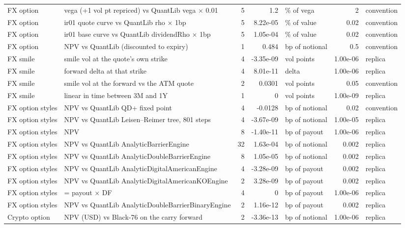 \documentclass[11pt,a4paper]{article}
\begin{document}
{\begin{longtable}{>{\raggedright\arraybackslash}p{2.2cm}>{\raggedright\arraybackslash}p{4.6cm} r r >{\raggedright\arraybackslash}p{1.8cm} r >{\raggedright\arraybackslash}p{1.8cm}}
FX option & vega (+1 vol pt repriced) vs QuantLib vega × 0.01 & 5 & 1.2 & \% of vega & 2 & convention \\
FX option & ir01 quote curve vs QuantLib rho × 1bp & 5 & 8.22e-05 & \% of value & 0.02 & convention \\
FX option & ir01 base curve vs QuantLib dividendRho × 1bp & 5 & 1.05e-04 & \% of value & 0.02 & convention \\
FX option & NPV vs QuantLib (discounted to expiry) & 1 & 0.484 & bp of notional & 0.5 & convention \\
FX smile & smile vol at the quote's own strike & 4 & -3.35e-09 & vol points & 1.00e-06 & replica \\
FX smile & forward delta at that strike & 4 & 8.01e-11 & delta & 1.00e-06 & replica \\
FX smile & smile vol at the forward vs the ATM quote & 2 & 0.0301 & vol points & 0.05 & convention \\
FX smile & linear in time between 3M and 1Y & 1 & 0 & vol points & 1.00e-09 & replica \\
FX option styles & NPV vs QuantLib QD+ fixed point & 4 & -0.0128 & bp of notional & 0.02 & convention \\
FX option styles & NPV vs QuantLib Leisen–Reimer tree, 801 steps & 4 & -3.67e-09 & bp of notional & 1.00e-05 & replica \\
FX option styles & NPV & 8 & -1.40e-11 & bp of payout & 1.00e-06 & replica \\
FX option styles & NPV vs QuantLib AnalyticBarrierEngine & 32 & 1.63e-04 & bp of notional & 0.002 & replica \\
FX option styles & NPV vs QuantLib AnalyticDoubleBarrierEngine & 8 & 1.05e-05 & bp of notional & 0.002 & replica \\
FX option styles & NPV vs QuantLib AnalyticDigitalAmericanEngine & 4 & -3.28e-09 & bp of payout & 0.002 & replica \\
FX option styles & NPV vs QuantLib AnalyticDigitalAmericanKOEngine & 2 & 3.28e-09 & bp of payout & 0.002 & replica \\
FX option styles & = payout × DF & 4 & 0 & bp of payout & 1.00e-06 & replica \\
FX option styles & NPV vs QuantLib AnalyticDoubleBarrierBinaryEngine & 2 & 1.16e-12 & bp of payout & 0.002 & replica \\
Crypto option & NPV (USD) vs Black-76 on the carry forward & 2 & -3.36e-13 & bp of notional & 1.00e-06 & replica \\

\end{longtable}}
\end{document}
